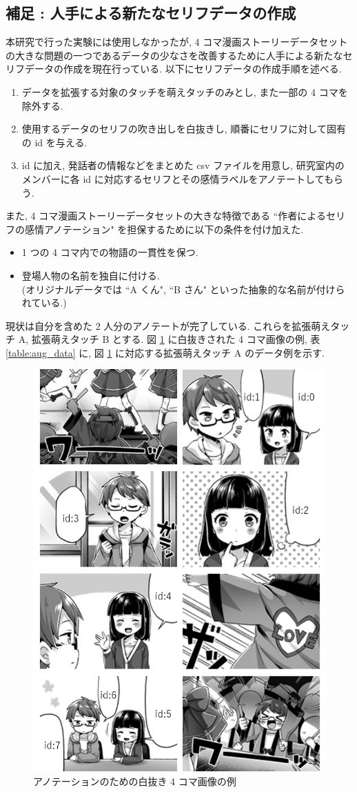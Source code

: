 \changeindent{0cm}
\subsection{補足 : 人手による新たなセリフデータの作成}
\changeindent{2cm}

本研究で行った実験には使用しなかったが, 4 コマ漫画ストーリーデータセットの大きな問題の一つであるデータの少なさを改善するために人手による新たなセリフデータの作成を現在行っている. 以下にセリフデータの作成手順を述べる.

\begin{enumerate}
  \item データを拡張する対象のタッチを萌えタッチのみとし, また一部の 4 コマを除外する.
  \item 使用するデータのセリフの吹き出しを白抜きし, 順番にセリフに対して固有の id を与える.
  \item id に加え, 発話者の情報などをまとめた csv ファイルを用意し, 研究室内のメンバーに各 id に対応するセリフとその感情ラベルをアノテートしてもらう.
\end{enumerate}

また, 4 コマ漫画ストーリーデータセットの大きな特徴である ``作者によるセリフの感情アノテーション" を担保するために以下の条件を付け加えた.

\begin{itemize}
  \item 1 つの 4 コマ内での物語の一貫性を保つ.
  \item 登場人物の名前を独自に付ける. \\ (オリジナルデータでは ``A くん", ``B さん" といった抽象的な名前が付けられている.)
\end{itemize}

現状は自分を含めた 2 人分のアノテートが完了している. これらを拡張萌えタッチ A, 拡張萌えタッチ B とする. 図 \ref{fig:shironuki} に白抜きされた 4 コマ画像の例, 表 \ref{table:aug_data} に, 図 \ref{fig:shironuki} に対応する拡張萌えタッチ A のデータ例を示す.

\newpage
\begin{figure}[!h]
  \vspace{10mm}
  \centering
  \includegraphics[width=0.4\hsize]{doc/figures/shironuki.png}
  \caption{アノテーションのための白抜き 4 コマ画像の例}
  \label{fig:shironuki}
\end{figure}

